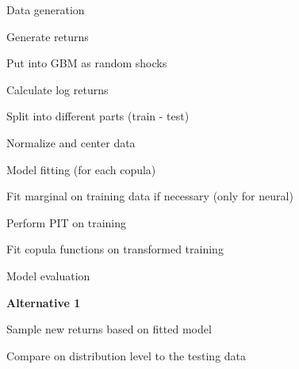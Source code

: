 \begin{generalinstructions}
    \begin{compactenum}
        \item Data generation
        \begin{compactenum}
            \item Generate returns
            \item Put into GBM as random shocks 
            \item Calculate log returns 
            \item Split into different parts (train - test)
            \item Normalize and center data
        \end{compactenum}
        \item Model fitting (for each copula)
        \begin{compactenum}
            \item Fit marginal on training data if necessary (only for neural) 
            \item Perform PIT on training
            \item Fit copula functions on transformed training
        \end{compactenum}
        \item Model evaluation
        
        \textbf{Alternative 1}
        \begin{compactenum}
            \item Sample new returns based on fitted model
            \item Compare on distribution level to the testing data
        \end{compactenum}
    \end{compactenum}
\end{generalinstructions}

